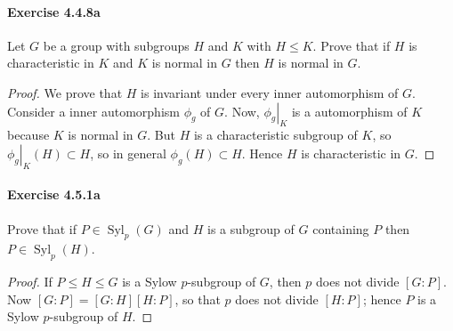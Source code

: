 \documentclass{article}
\theoremstyle{definition}
\begin{document}
\paragraph{Exercise 4.4.8a} Let $G$ be a group with subgroups $H$ and $K$ with $H \leq K$. Prove that if $H$ is characteristic in $K$ and $K$ is normal in $G$ then $H$ is normal in $G$.
\begin{proof}
We prove that $H$ is invariant under every inner automorphism of $G$. Consider a inner automorphism $\phi_g$ of $G$. Now, $\left.\phi_g\right|_K$ is a automorphism of $K$ because $K$ is normal in $G$. But $H$ is a characteristic subgroup of $K$, so $\left.\phi_g\right|_K(H) \subset H$, so in general $\phi_g(H) \subset H$. Hence $H$ is characteristic in $G$.
\end{proof}



\paragraph{Exercise 4.5.1a} Prove that if $P \in \operatorname{Syl}_{p}(G)$ and $H$ is a subgroup of $G$ containing $P$ then $P \in \operatorname{Syl}_{p}(H)$.
\begin{proof}
If $P \leq H \leq G$ is a Sylow $p$-subgroup of $G$, then $p$ does not divide $[G: P]$. Now $[G: P]=[G: H][H: P]$, so that $p$ does not divide $[H: P]$; hence $P$ is a Sylow $p$-subgroup of $H$.
\end{proof}
\end{document}

